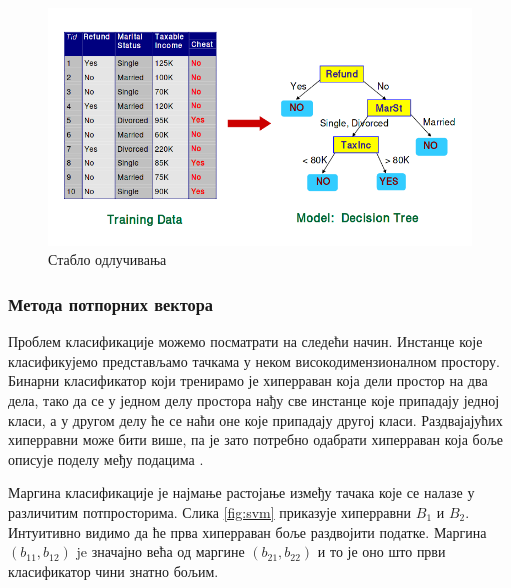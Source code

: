 \documentclass[a4paper]{article}
\begin{document}
{\begin{figure}[h!]
\begin{center}
\includegraphics[scale=0.4]{decision_tree.png}
\end{center}
\caption{Стабло одлучивања}
\label{fig:stablo}
\end{figure}


\subsubsection*{Метода потпорних вектора}
Проблем класификације можемо посматрати на следећи начин. Инстанце које класификујемо представљамо тачкама у неком високодимензионалном простору. Бинарни класификатор који тренирамо је хиперраван која дели простор на два дела, тако да се у једном делу простора нађу све инстанце које припадају једној класи, а у другом делу ће се наћи оне које припадају другој класи. Раздвајајућих хиперравни може бити више, па је зато потребно одабрати хиперраван која боље описује поделу међу подацима \cite{svm-intro}.


Маргина класификације је најмање растојање између тачака које се налазе у различитим потпросторима. Слика \ref{fig:svm} приказује хиперравни $B_1$ и $B_2$. Интуитивно видимо да ће прва хиперраван боље раздвојити податке. Маргина $(b_11, b_12)$ je значајно већа од маргине $(b_21, b_22)$ и то је оно што први класификатор чини знатно бољим.

}
\end{document}

